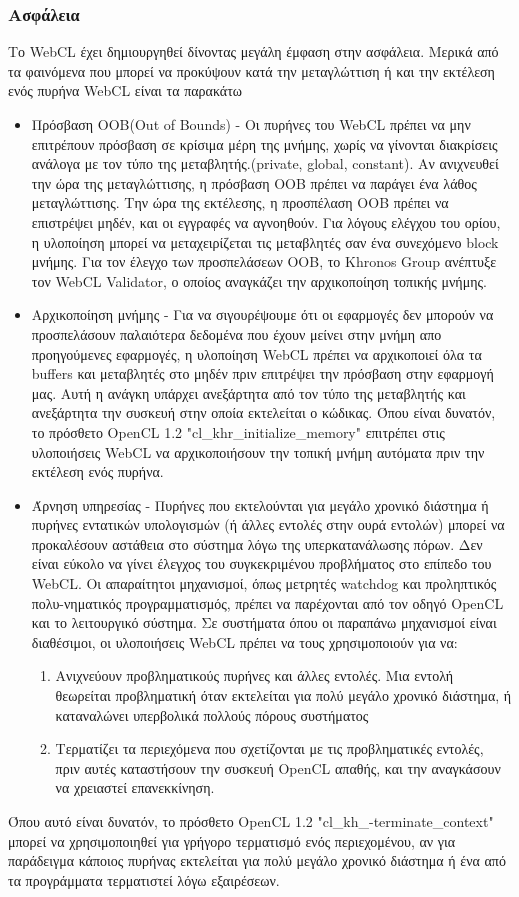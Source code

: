 \subsubsection{Ασφάλεια}
Το WebCL έχει δημιουργηθεί δίνοντας μεγάλη έμφαση στην ασφάλεια. Μερικά από τα φαινόμενα που μπορεί να προκύψουν κατά την μεταγλώττιση ή και την εκτέλεση ενός πυρήνα WebCL είναι τα παρακάτω
\begin{itemize}
\item Πρόσβαση OOB(Out of Bounds) - Οι πυρήνες του WebCL πρέπει να μην επιτρέπουν πρόσβαση σε κρίσιμα μέρη της μνήμης, χωρίς να γίνονται διακρίσεις ανάλογα με τον τύπο της μεταβλητής.(private, global, constant). Αν ανιχνευθεί την ώρα της μεταγλώττισης, η πρόσβαση OOB πρέπει να παράγει ένα λάθος μεταγλώττισης. Την ώρα της εκτέλεσης, η προσπέλαση OOB πρέπει να επιστρέψει μηδέν, και οι εγγραφές να αγνοηθούν. Για λόγους ελέγχου του ορίου, η υλοποίηση μπορεί να μεταχειρίζεται τις μεταβλητές σαν ένα συνεχόμενο block μνήμης. Για τον έλεγχο των προσπελάσεων OOB, το Khronos Group ανέπτυξε τον WebCL Validator, ο οποίος αναγκάζει την αρχικοποίηση τοπικής μνήμης.
\item Αρχικοποίηση μνήμης - Για να σιγουρέψουμε ότι οι εφαρμογές δεν μπορούν να προσπελάσουν παλαιότερα δεδομένα που έχουν μείνει στην μνήμη απο προηγούμενες εφαρμογές, η υλοποίηση WebCL πρέπει να αρχικοποιεί όλα τα buffers και μεταβλητές στο μηδέν πριν επιτρέψει την πρόσβαση στην εφαρμογή μας. Αυτή η ανάγκη υπάρχει ανεξάρτητα από τον τύπο της μεταβλητής και ανεξάρτητα την συσκευή στην οποία εκτελείται ο κώδικας. Όπου είναι δυνατόν, το πρόσθετο OpenCL 1.2 "cl{\_}khr{\_}initialize{\_}memory" επιτρέπει στις υλοποιήσεις WebCL να αρχικοποιήσουν την τοπική μνήμη αυτόματα πριν την εκτέλεση ενός πυρήνα.
\item Άρνηση υπηρεσίας - Πυρήνες που εκτελούνται για μεγάλο χρονικό διάστημα ή πυρήνες εντατικών υπολογισμών (ή άλλες εντολές στην ουρά εντολών) μπορεί να προκαλέσουν αστάθεια στο σύστημα λόγω της υπερκατανάλωσης πόρων. Δεν είναι εύκολο να γίνει έλεγχος του συγκεκριμένου προβλήματος στο επίπεδο του WebCL. Οι απαραίτητοι μηχανισμοί, όπως μετρητές watchdog και προληπτικός πολυ-νηματικός προγραμματισμός, πρέπει να παρέχονται από τον οδηγό OpenCL και το λειτουργικό σύστημα. Σε συστήματα όπου οι παραπάνω μηχανισμοί είναι διαθέσιμοι, οι υλοποιήσεις WebCL πρέπει να τους χρησιμοποιούν για να:
	\begin{enumerate}
		\item Ανιχνεύουν προβληματικούς πυρήνες και άλλες εντολές. Μια εντολή θεωρείται προβληματική όταν εκτελείται για πολύ μεγάλο χρονικό διάστημα, ή καταναλώνει υπερβολικά πολλούς πόρους συστήματος
		\item Τερματίζει τα περιεχόμενα που σχετίζονται με τις προβληματικές εντολές, πριν αυτές καταστήσουν την συσκευή OpenCL απαθής, και την αναγκάσουν να χρειαστεί επανεκκίνηση.
	\end{enumerate}
\end{itemize}
Όπου αυτό είναι δυνατόν, το πρόσθετο OpenCL 1.2 "cl{\_}kh{\_}-terminate{\_}context" μπορεί να χρησιμοποιηθεί για γρήγορο τερματισμό ενός περιεχομένου, αν για παράδειγμα κάποιος πυρήνας εκτελείται για πολύ μεγάλο χρονικό διάστημα ή ένα από τα προγράμματα τερματιστεί λόγω εξαιρέσεων.
